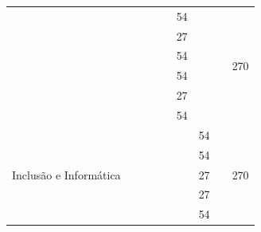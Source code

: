 \documentclass[11pt,fleqn]{book} %
\begin{document}
\begin{table}[]
{\begin{tabular}{|l|l|c|c|c|c|c|c|c|}
			& \nameref{4_ppw1}                                              &                 &                 &                 & 54              &                 &                 & \multirow{6}{*}{270} \\ \cline{2-8}
			& \nameref{4_ihc}                                               &                 &                 &                 & 27              &                 &                 &                      \\ \cline{2-8}
			& \nameref{4_asi}                                               &                 &                 &                 & 54              &                 &                 &                      \\ \cline{2-8}
			& \nameref{4_probest}                                           &                 &                 &                 & 54              &                 &                 &                      \\ \cline{2-8}
			& \nameref{4_etnicoraciais}                                     &                 &                 &                 & 27              &                 &                 &                      \\ \cline{2-8}
			& \nameref{4_projsoc}                                           &                 &                 &                 & 54              &                 &                 &                      \\ \hline
			\multirow{6}{*}{Inclusão e Informática}                          
     		& \nameref{5_ppw2}                                              &                 &                 &                 &                 & 54              &                 & \multirow{6}{*}{270} \\ \cline{2-8}
			& \nameref{5_metodologia}                                       &                 &                 &                 &                 & 54              &                 &                      \\ \cline{2-8}
			& \nameref{5_libras}                                            &                 &                 &                 &                 & 27              &                 &                      \\ \cline{2-8}
			& \nameref{5_etica}                                             &                 &                 &                 &                 & 27              &                 &                      \\ \cline{2-8}
			& \nameref{5_opt}                                               &                 &                 &                 &                 & 54              &                 &                      \\ \cline{2-8}

\end{tabular}}
\end{table}
\end{document}
